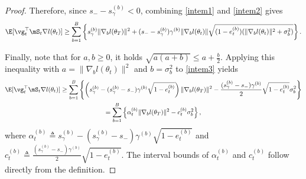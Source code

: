 \documentclass[11pt, a4paper, twocolumn, copyright, goog]{google}
\theoremstyle{plain}
\theoremstyle{definition}
\theoremstyle{remark}
\begin{document}
\begin{proof}
    Therefore, since $s_- - s_{\gamma}^{(b)} < 0$, combining \eqref{intem1} and \eqref{intem2} gives 
    \begin{equation} \label{intem3}
        \E [\vg_t^\top \mS_t \nabla l(\theta_t)] \ge 
        \sum_{b=1}^{B} \left\lbrace s_{\gamma}^{(b)} \| \nabla_b l (\theta_T) \|^2  
        +  (s_- - s_{\gamma}^{(b)}) \gamma^{(b)} \| \nabla_b l(\theta_t) \| \sqrt{(1 - e_t^{(b)}) (\|\nabla_b l(\theta_t) \|^2 + \sigma^2_b)} \right\rbrace.
    \end{equation}
    
    Finally, note that for $a, b\ge 0$, it holds $ \sqrt{a (a+b)} \le a + \frac{b}{2}$. Applying this inequality with $a = \| \nabla_b l(\theta_t) \|^2$ and $b = \sigma^2_b$ to \eqref{intem3} yields 
    \begin{multline} \label{intem4}
        \E [\vg_t^\top \mS_t \nabla l(\theta_t)] \ge 
        \sum_{b=1}^{B} \left\lbrace 
            \left(s_{\gamma}^{(b)} - (s_{\gamma}^{(b)} - s_-) \gamma^{(b)} \sqrt{1 - e_t^{(b)}} \right) \| \nabla_b l (\theta_T) \|^2  
        -  \frac{(s_{\gamma}^{(b)} - s_-)\gamma^{(b)}}{2} \sqrt{1 - e_t^{(b)}}  \sigma^2_b \right\rbrace \\ 
        = \sum_{b=1}^{B} \left\lbrace 
            \alpha_t^{(b)} \| \nabla_b l (\theta_T) \|^2  
        -  c_t^{(b)}  \sigma^2_b \right\rbrace,
    \end{multline}
    where $\alpha_t^{(b)} \triangleq s_{\gamma}^{(b)} - (s_{\gamma}^{(b)} - s_-) \gamma^{(b)} \sqrt{1 - e_t^{(b)}}$ and $c_t^{(b)} \triangleq \frac{(s_{\gamma}^{(b)} - s_-)\gamma^{(b)}}{2} \sqrt{1 - e_t^{(b)}}$. The interval bounds of $\alpha_t^{(b)}$ and $c_t^{(b)}$ follow directly from the definition. 
    
\end{proof}
\end{document}
